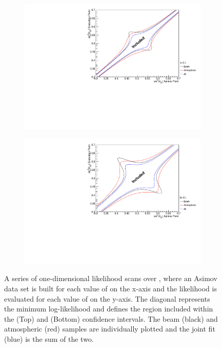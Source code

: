 \begin{figure}[h]
  \begin{subfigure}[t]{1.0\textwidth}
    \includegraphics[width=\textwidth, trim={0mm 0mm 0mm 0mm}, clip,page=1]{Figures/OA/TH23_Scans_1Sig.pdf}
  \end{subfigure}                                                                                                                                                                                          
  \begin{subfigure}[t]{1.0\textwidth}
    \includegraphics[width=\textwidth, trim={0mm 0mm 0mm 0mm}, clip,page=1]{Figures/OA/TH23_Scans_2Sig.pdf}
  \end{subfigure}
  \caption{A series of one-dimensional likelihood scans over , where an Asimov data set is built for each value of  on the x-axis and the likelihood is evaluated for each value of  on the y-axis. The diagonal represents the minimum log-likelihood and defines the region included within the \quickmath{1\sigma} (Top) and \quickmath{2\sigma} (Bottom) confidence intervals. The beam (black) and atmospheric (red) samples are individually plotted and the joint fit (blue) is the sum of the two.}
  \label{fig:OscillationAnalysis_AsimovEval_TH23}
\end{figure}

